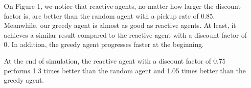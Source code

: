 \documentclass[11pt]{article}
\begin{document}
On Figure 1, we notice that reactive agents, no matter how larger the discount factor is, are better than the random agent with a pickup rate of 0.85. Meanwhile, our greedy agent is almost as good as reactive agents. At least, it achieves a similar result compared to the reactive agent with a discount factor of 0. In addition, the greedy agent progresses faster at the beginning.

At the end of simulation, the reactive agent with a discount factor of 0.75 performs 1.3 times better than the random agent and 1.05 times better than the greedy agent.

\begin{figure}
\centering
{}\hfill
{}\hfill
{}


\end{figure}
\end{document}
